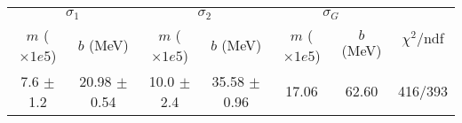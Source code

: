 \begin{tabular}{cc|cc|cc||c}
\multicolumn{2}{c|}{$\sigma_1$} & \multicolumn{2}{|c}{$\sigma_2$} & \multicolumn{2}{|c}{$\sigma_G$}  & \multirow{2}{*}{$\chi^2/$ndf}\\
$m$ ($\times1e5$) & $b$ (MeV) & $m$ ($\times1e5$) & $b$ (MeV) & $m$ ($\times1e5$) & $b$ (MeV) & \\
\hline
7.6 $\pm$ 1.2 & 20.98 $\pm$ 0.54 & 10.0 $\pm$ 2.4 & 35.58 $\pm$ 0.96 & 17.06 & 62.60 & 416/393\\
\end{tabular}
